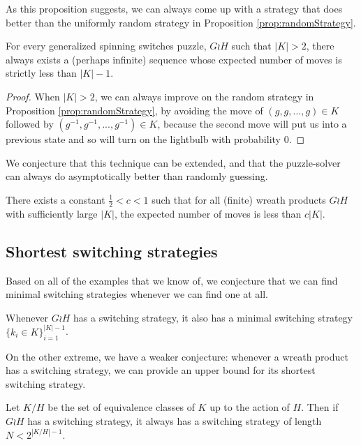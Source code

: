 As this proposition suggests, we can always come up with a strategy that does
better than the uniformly random strategy in Proposition \ref{prop:randomStrategy}.

\begin{proposition}
  For every generalized spinning switches puzzle, $G \wr H$ such that
  $|K| > 2$, there always exists a (perhaps infinite) sequence
  whose expected number of moves is strictly less than $|K| - 1$.
\end{proposition}
\begin{proof}
  When $|K| > 2$, we can always improve on the random strategy in
  Proposition \ref{prop:randomStrategy}, by avoiding the move of
  $(g,g, ..., g) \in K$ followed by $(g^{-1},g^{-1}, ..., g^{-1}) \in K$,
  because the second move will put us into a previous state and so will
  turn on the lightbulb with probability $0$.
\end{proof}

We conjecture that this technique can be extended, and that the puzzle-solver
can always do asymptotically better than randomly guessing.

\begin{conjecture}
  There exists a constant $\frac{1}{2} < c < 1$ such that for all
  (finite) wreath products $G \wr H$ with sufficiently large $|K|$,
  the expected number of moves is less than $c|K|$.
\end{conjecture}

\subsection{Shortest switching strategies}
Based on all of the examples that we know of, we conjecture that we can find
minimal switching strategies whenever we can find one at all.
\begin{conjecture}
  Whenever $G \wr H$ has a switching strategy, it also has a minimal switching
  strategy $\{k_i \in K\}_{i=1}^{|K| - 1}$.
\end{conjecture}

On the other extreme, we have a weaker conjecture: whenever a wreath product has
a switching strategy, we can provide an upper bound for its shortest switching
strategy.

\begin{conjecture}
  Let $K/H$ be the set of equivalence classes of $K$ up to the action of $H$.
  Then if $G \wr H$ has a switching strategy, it always has a switching strategy
  of length $N < 2^{|K/H|-1}$.
\end{conjecture}

